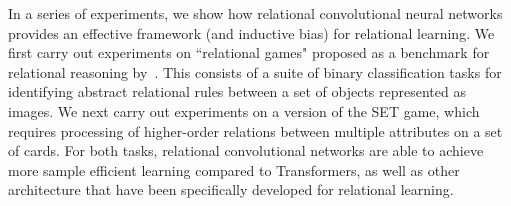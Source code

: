 In a series of experiments, we show how relational convolutional neural networks provides an effective framework (and inductive bias) for relational learning. 
We first carry out experiments on ``relational games" 
proposed as a benchmark for relational reasoning by~\citep{shanahanExplicitlyRelationalNeural}. This consists of 
a suite of binary classification tasks for identifying abstract relational rules between a set of objects represented as images. We next carry out experiments 
on a version of the SET game, which requires processing of  higher-order relations 
between multiple attributes on a set of cards. For both tasks, relational 
convolutional networks are able to achieve more sample efficient learning compared  
to Transformers, as well as other architecture that have been specifically developed 
for relational learning. 





